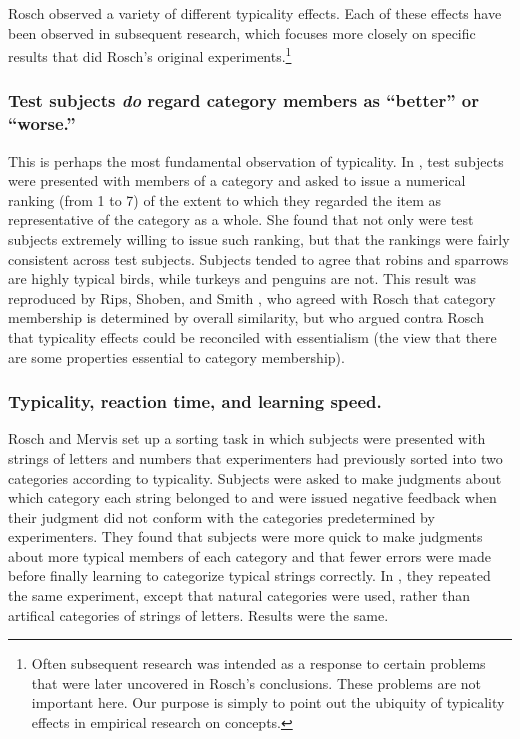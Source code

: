 Rosch observed a variety of different typicality effects. Each of these effects have been observed in subsequent research, which focuses more closely on specific results that did Rosch's original experiments.\footnote{Often subsequent research was intended as a response to certain problems that were later uncovered in Rosch's conclusions. These problems are not important here. Our purpose is simply to point out the ubiquity of typicality effects in empirical research on concepts.}

\subsubsection{Test subjects \emph{do} regard category members as ``better'' or ``worse.''} This is perhaps the most fundamental observation of typicality. In \cite[Experiment 1]{rosch_cognitive_1975}, test subjects were presented with members of a category and asked to issue a numerical ranking (from 1 to 7) of the extent to which they regarded the item as representative of the category as a whole. She found that not only were test subjects extremely willing to issue such ranking, but that the rankings were fairly consistent across test subjects. Subjects tended to agree that robins and sparrows are highly typical birds, while turkeys and penguins are not. This result was reproduced by Rips, Shoben, and Smith \cite{rips_semantic_1973}, who agreed with Rosch that category membership is determined by overall similarity, but who argued contra Rosch that typicality effects could be reconciled with essentialism (the view that there are some properties essential to category membership).

\subsubsection{Typicality, reaction time, and learning speed.} Rosch and Mervis \cite[Experiment 5]{rosch_family_1975} set up a sorting task in which subjects were presented with strings of letters and numbers that experimenters had previously sorted into two categories according to typicality. Subjects were asked to make judgments about which category each string belonged to and were issued negative feedback when their judgment did not conform with the categories predetermined by experimenters. They found that subjects were more quick to make judgments about more typical members of each category and that fewer errors were made before finally learning to categorize typical strings correctly. In \cite[Experiment 6]{rosch_family_1975}, they repeated the same experiment, except that natural categories were used, rather than artifical categories of strings of letters. Results were the same.

